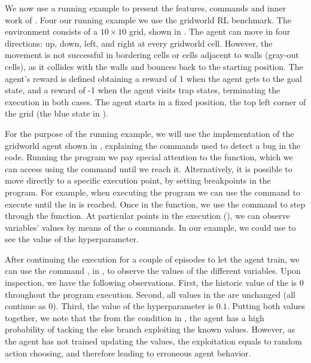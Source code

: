 We now use a running example to present the features, commands and inner work of \flik. Four 
our running example we use the gridworld \ac{RL} benchmark. The environment consists of a 
$10 \times 10$ grid, shown in . The agent can move in four directions: up, down, 
left, and right at every gridworld cell. However, the movement is not successful in bordering cells 
or cells adjacent to walls (\ie gray-out cells), as it collides with the walls and bounces back to the 
starting position.
The agent's reward is defined obtaining a reward of 1 when the agent gets to the goal state, and a 
reward of -1 when the agent visits trap states, terminating the execution in both cases. The agent 
starts in a fixed position, the top left corner of the grid (the blue state in ). 

For the purpose of the running example, we will use the implementation of the gridworld agent shown 
in , explaining the \flik commands used to detect a bug in the code. 
Running the program we pay special attention to the  function, which we can access using 
the  command until we reach it. Alternatively, it is possible to move directly to a specific 
execution point, by setting breakpoints in the program. For example, when executing the program we 
can use the  command to execute until the  in  is reached. 
Once in the function, we use the  command to step through the function. 
At particular points in the execution (\eg {}), we can observe variables' values by means 
of the  o  commands. In our example, we could use  to see the 
value of the  hyperparameter. 

After continuing the execution for a couple of episodes to let the agent train, we can use the 
command , in , to observe the values of the different variables. Upon 
inspection, we have the following observations. First, the historic value of the  is $0$ 
throughout the program execution. Second, all values in the  are unchanged (all continue 
as 0). Third, the value of the  hyperparameter is $0.1$. 
Putting both values together, we note that the from the condition in , the agent has a 
high probability of tacking the else branch exploiting the known values. However, as the agent has 
not trained updating the values, the exploitation equals to random action choosing, and therefore 
leading to erroneous agent behavior.

